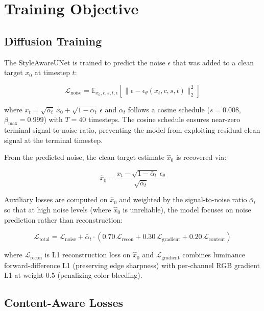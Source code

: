 \section{Training Objective}

\subsection{Diffusion Training}

The StyleAwareUNet is trained to predict the noise $\epsilon$ that was added to a clean target $x_0$ at timestep $t$:

\begin{equation}
    \mathcal{L}_{\text{noise}} = \mathbb{E}_{x_0, c, s, t, \epsilon}\left[ \|\epsilon - \epsilon_\theta(x_t, c, s, t)\|_2^2 \right]
\end{equation}

where $x_t = \sqrt{\bar{\alpha}_t}\,x_0 + \sqrt{1 - \bar{\alpha}_t}\,\epsilon$ and $\bar{\alpha}_t$ follows a cosine schedule ($s=0.008$, $\beta_{\max}=0.999$) with $T=40$ timesteps. The cosine schedule ensures near-zero terminal signal-to-noise ratio, preventing the model from exploiting residual clean signal at the terminal timestep.

From the predicted noise, the clean target estimate $\hat{x}_0$ is recovered via:

\begin{equation}
    \hat{x}_0 = \frac{x_t - \sqrt{1 - \bar{\alpha}_t}\,\epsilon_\theta}{\sqrt{\bar{\alpha}_t}}
\end{equation}

Auxiliary losses are computed on $\hat{x}_0$ and weighted by the signal-to-noise ratio $\bar{\alpha}_t$ so that at high noise levels (where $\hat{x}_0$ is unreliable), the model focuses on noise prediction rather than reconstruction:

\begin{equation}
    \mathcal{L}_{\text{total}} = \mathcal{L}_{\text{noise}} + \bar{\alpha}_t \cdot \left(0.70\,\mathcal{L}_{\text{recon}} + 0.30\,\mathcal{L}_{\text{gradient}} + 0.20\,\mathcal{L}_{\text{content}}\right)
\end{equation}

where $\mathcal{L}_{\text{recon}}$ is L1 reconstruction loss on $\hat{x}_0$ and $\mathcal{L}_{\text{gradient}}$ combines luminance forward-difference L1 (preserving edge sharpness) with per-channel RGB gradient L1 at weight 0.5 (penalizing color bleeding).

\subsection{Content-Aware Losses}

